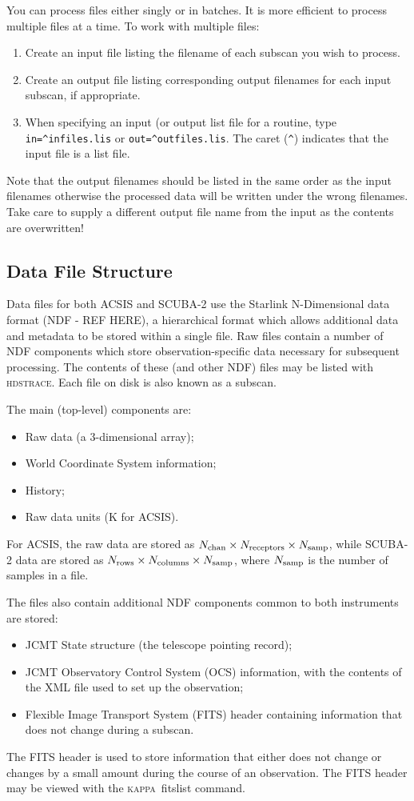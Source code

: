 \documentclass[twoside,11pt]{article}
\newcommand{\xref}[3]{#1}
\renewcommand{\_}{\texttt{\symbol{95}}}
\newcommand{\HDSTRACE}{\textsc{hdstrace}}
\newcommand{\HDSTRACEref}{\xref{\HDSTRACE}{sun102}{}}
\newcommand{\KAPPA}{\textsc{kappa}}
\begin{document}
You can process files either singly or in batches. It is more
efficient to process multiple files at a time. To work with multiple
files:
\begin{enumerate}
\item Create an input file listing the filename of each subscan you
  wish to process.
\item Create an output file listing corresponding output filenames for
  each input subscan, if appropriate.
\item When specifying an input (or output list file for a routine,
  type \verb+in=^infiles.lis+ or \verb+out=^outfiles.lis+. The caret
  (\verb+^+) indicates that the input file is a list file.
\end{enumerate}
Note that the output filenames should be listed in the same order as
the input filenames otherwise the processed data will be written under
the wrong filenames. Take care to supply a different output file name
from the input as the contents are overwritten!

\subsection{Data File Structure}

Data files for both ACSIS and SCUBA-2 use the Starlink N-Dimensional
data format (NDF - REF HERE), a hierarchical format which allows
additional data and metadata to be stored within a single file. Raw
files contain a number of NDF components which store
observation-specific data necessary for subsequent processing. The
contents of these (and other NDF) files may be listed with
\HDSTRACEref. Each file on disk is also known as a subscan.

The main (top-level) components are:
\begin{itemize}
\item Raw data (a 3-dimensional array);
\item World Coordinate System information;
\item History;
\item Raw data units (K for ACSIS).
\end{itemize}
For ACSIS, the raw data are stored as $N_{\rm chan} \times N_{\rm
  receptors} \times N_{\rm samp}$, while SCUBA-2 data are stored as
$N_{\rm rows} \times N_{\rm columns} \times N_{\rm samp}$, where
$N_{\rm samp}$ is the number of samples in a file.

The files also contain additional NDF components common to both
instruments are stored:
\begin{itemize}
\item JCMT State structure (the telescope pointing record);
\item JCMT Observatory Control System (OCS) information, with the
  contents of the XML file used to set up the observation;
\item Flexible Image Transport System (FITS) header containing
  information that does not change during a subscan.
\end{itemize}
The FITS header is used to store information that either does not
change or changes by a small amount during the course of an
observation. The FITS header may be viewed with the \KAPPA\ fitslist
command.
\end{document}
